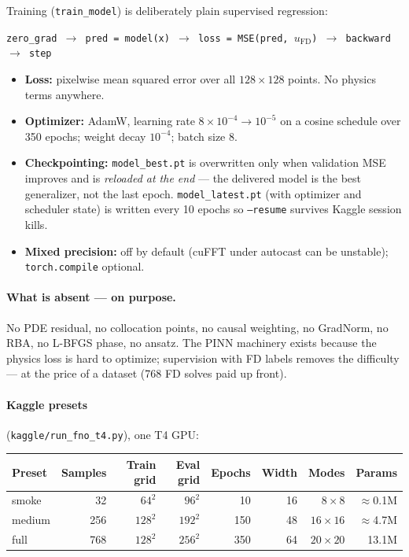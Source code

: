 \documentclass[11pt,a4paper]{article}
\begin{document}
Training (\texttt{train\_model}) is deliberately plain supervised regression:
\begin{center}
\texttt{zero\_grad $\to$ pred = model(x) $\to$ loss = MSE(pred, $u_{\mathrm{FD}}$) $\to$ backward $\to$ step}
\end{center}
\begin{itemize}[nosep]
  \item \textbf{Loss:} pixelwise mean squared error over all $128 \times 128$
        points. No physics terms anywhere.
  \item \textbf{Optimizer:} AdamW, learning rate $8\!\times\!10^{-4} \to 10^{-5}$
        on a cosine schedule over 350 epochs; weight decay $10^{-4}$; batch size 8.
  \item \textbf{Checkpointing:} \texttt{model\_best.pt} is overwritten only when
        validation MSE improves and is \emph{reloaded at the end} --- the
        delivered model is the best generalizer, not the last epoch.
        \texttt{model\_latest.pt} (with optimizer and scheduler state) is
        written every 10 epochs so \texttt{--resume} survives Kaggle session kills.
  \item \textbf{Mixed precision:} off by default (cuFFT under autocast can be
        unstable); \texttt{torch.compile} optional.
\end{itemize}

\paragraph{What is absent --- on purpose.} No PDE residual, no collocation
points, no causal weighting, no GradNorm, no RBA, no L-BFGS phase, no ansatz.
The PINN machinery exists because the physics loss is hard to optimize;
supervision with FD labels removes the difficulty --- at the price of a dataset
(768 FD solves paid up front).

\paragraph{Kaggle presets} (\texttt{kaggle/run\_fno\_t4.py}), one T4 GPU:
\begin{center}
\begin{tabular}{@{}lrrrrrrr@{}}
\toprule
Preset & Samples & Train grid & Eval grid & Epochs & Width & Modes & Params \\
\midrule
smoke  & 32  & $64^2$  & $96^2$  & 10  & 16 & $8\times8$   & $\approx$0.1M \\
medium & 256 & $128^2$ & $192^2$ & 150 & 48 & $16\times16$ & $\approx$4.7M \\
full   & 768 & $128^2$ & $256^2$ & 350 & 64 & $20\times20$ & 13.1M \\
\bottomrule
\end{tabular}
\end{center}
\end{document}
